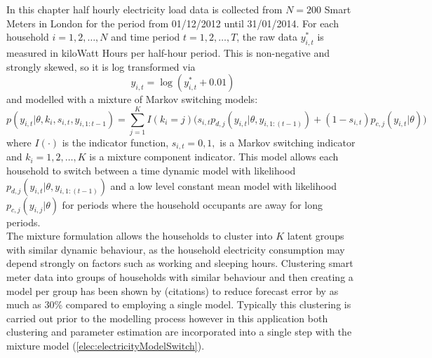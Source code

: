 \documentclass[
12pt, %
onehalfspacing, %
nohyperref, %
headsepline, %
chapterinoneline, %
]{MastersDoctoralThesis} %
\begin{document}
In this chapter half hourly electricity load data is collected from $N = 200$ Smart Meters in London for the period from 01/12/2012 until 31/01/2014. For each household $i = 1, 2, \ldots, N$ and time period $t = 1, 2, \ldots, T$, the raw data $y_{i, t}^*$ is measured in kiloWatt Hours per half-hour period. This is non-negative and strongly skewed, so it is log transformed via
\begin{equation}
\label{elec:logY}
y_{i, t} = \log(y_{i, t}^* + 0.01)
\end{equation}
\iffalse
and modelled with a mixture of Markov switching models:
\begin{equation}
\label{elec:electricityModelSwitch}
p(y_{i, t} | \theta, k_i, s_{i, t}, y_{i, 1:t-1}) = \sum_{j=1}^K I(k_{i} = j) \big(s_{i, t} p_{d, j}(y_{i, t} | \theta, y_{i, 1:(t-1)}) + (1 - s_{i, t}) p_{c, j} (y_{i, t} | \theta) \big)
\end{equation}
where $I(\cdot)$ is the indicator function, $s_{i, t} = 0, 1,$ is a Markov switching indicator and $k_i = 1, 2, \dots, K$ is a mixture component indicator. This model allows each household to switch between a time dynamic model with likelihood $p_{d, j} (y_{i, t} | \theta, y_{i, 1:(t-1)})$ and a low level constant mean model with likelihood $p_{c, j}(y_{i, j} | \theta)$ for periods where the household occupants are away for long periods.
\\

The mixture formulation allows the households to cluster into $K$ latent groups with similar dynamic behaviour, as the household electricity consumption may depend strongly on factors such as working and sleeping hours. Clustering smart meter data into groups of households with similar behaviour and then creating a model per group has been shown by (citations) to reduce forecast error by as much as 30\% compared to employing a single model. Typically this clustering is carried out prior to the modelling process however in this application both clustering and parameter estimation are incorporated into a single step with the mixture model (\ref{elec:electricityModelSwitch}).
\\
\end{document}
